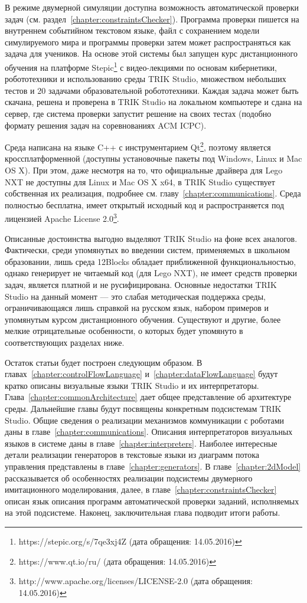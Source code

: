 \documentclass[conference]{IEEEtran}
\begin{document}
В режиме двумерной симуляции доступна возможность автоматической проверки задач (см. раздел~\ref{chapter:constraintsChecker}). Программа проверки пишется на внутреннем событийном текстовом языке, файл с сохранением модели симулируемого мира и программы проверки затем может распространяться как задача для учеников. На основе этой системы был запущен курс дистанционного обучения на платформе Stepic\footnote{https://stepic.org/s/7qe3xj4Z  (дата обращения: 14.05.2016)} с видео-лекциями по основам кибернетики, робототехники и использованию среды TRIK Studio, множеством небольших тестов и 20 задачами образовательной робототехники. Каждая задача может быть скачана, решена и проверена в TRIK Studio на локальном компьютере и сдана на сервер, где система проверки запустит решение на своих тестах (подобно формату решения задач на соревнованиях ACM ICPC).

Среда написана на языке C++ с инструментарием Qt\footnote{https://www.qt.io/ru/ (дата обращения: 14.05.2016)}, поэтому является кроссплатформенной (доступны установочные пакеты под Windows, Linux и Mac OS X). При этом, даже несмотря на то, что официальные драйвера для Lego NXT не доступны для Linux и Mac OS X x64, в TRIK Studio существует собственная их реализация, подробнее см. главу~\ref{chapter:communications}. Среда полностью бесплатна, имеет открытый исходный код и распространяется под лицензией Apache License 2.0\footnote{http://www.apache.org/licenses/LICENSE-2.0 (дата обращения: 14.05.2016)}.

Описанные достоинства выгодно выделяют TRIK Studio на фоне всех аналогов. Фактически, среди упомянутых во введении систем, применяемых в школьном образовании, лишь среда 12Blocks обладает приближенной функциональностью, однако генерирует не читаемый код (для Lego NXT), не имеет средств проверки задач, является платной и не русифицирована. Основные недостатки TRIK Studio на данный момент --- это слабая методическая поддержка среды, ограничивающаяся лишь справкой на русском язык, набором примеров и упомянутым курсом дистанционного обучения. Существуют и другие, более мелкие отрицательные особенности, о которых будет упомянуто в соответствующих разделах ниже.

Остаток статьи будет построен следующим образом. В главах~\ref{chapter:controlFlowLanguage} и~\ref{chapter:dataFlowLanguage} будут кратко описаны визуальные языки TRIK Studio и их интерпретаторы. Глава~\ref{chapter:commonArchitecture} дает общее представление об архитектуре среды. Дальнейшие главы будут посвящены конкретным подсистемам TRIK Studio. Общие сведения о реализации механизмов коммуникации с роботами даны в главе~\ref{chapter:communications}. Описания интерпретаторов визуальных языков в системе даны в главе~\ref{chapter:interpreters}. Наиболее интересные детали реализации генераторов в текстовые языки из диаграмм потока управления представлены в главе~\ref{chapter:generators}. В главе~\ref{chapter:2dModel} рассказывается об особенностях реализации подсистемы двумерного имитационного моделирования, далее, в главе~\ref{chapter:constraintsChecker} описан язык описания программ автоматической проверки заданий, исполняемых на этой подсистеме. Наконец, заключительная глава подводит итоги работы.
\end{document}

